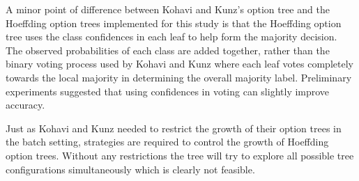 A minor point of difference between Kohavi and Kunz's option tree and the Hoeffding option trees implemented for this study is that the Hoeffding option tree uses the class confidences in each leaf to help form the majority decision. The observed probabilities of each class are added together, rather than the binary voting process used by Kohavi and Kunz where each leaf votes completely towards the local majority in determining the overall majority label. Preliminary experiments suggested that using confidences in voting can slightly improve accuracy.

Just as Kohavi and Kunz needed to restrict the growth of their option trees in the batch setting, strategies are required to control the growth of Hoeffding option trees. Without any restrictions the tree will try to explore all possible tree configurations simultaneously which is clearly not feasible.

